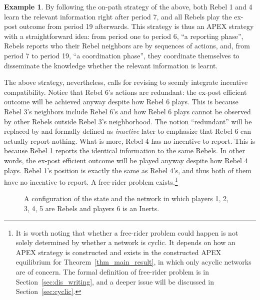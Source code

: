 \documentclass[12pt,letter]{article}
\theoremstyle{definition}
\newtheorem{example}{Example}
\theoremstyle{definition}
\theoremstyle{remark}
\theoremstyle{claim}
\begin{document}
\begin{example}
By following the on-path strategy of the above, both Rebel 1 and 4 learn the relevant information right after period 7, and all Rebels play the ex-post outcome from period 19 afterwards. This strategy is thus an APEX strategy with a straightforward idea: from period one to period 6, ``a {reporting phase}'', Rebels reports who their Rebel neighbors are by sequences of actions, and, from period 7 to period 19, ``a {coordination phase}'', they coordinate themselves to disseminate the knowledge whether the relevant information is learnt. 
\end{example}

The above strategy, nevertheless, calls for revising to seemly integrate incentive compatibility. Notice that Rebel 6's actions are redundant: the ex-post efficient outcome will be achieved anyway despite how Rebel 6 plays. This is because Rebel 3's neighbors include Rebel 6's and how Rebel 6 plays cannot be observed by other Rebels outside Rebel 3's neighborhood. The notion ``redundant'' will be replaced by and formally defined as \textit{inactive} later to emphasize that Rebel 6 can actually report nothing. What is more, Rebel 4 has no incentive to report. This is because Rebel 1 reports the identical information to the same Rebels. In other words, the ex-post efficient outcome will be played anyway despite how Rebel 4 plays. Rebel 1's position is exactly the same as Rebel 4's, and thus both of them have no incentive to report. A free-rider problem exists.\footnote{It is worth noting that whether a free-rider problem could happen is not solely determined by whether a network is cyclic. It depends on how an APEX strategy is constructed and exists in the constructed APEX equilibrium for Theorem~\ref{thm_main_result}, in which only acyclic networks are of concern. The formal definition of free-rider problem is in Section~\ref{sec:dis_writing}, and a deeper issue will be discussed in Section~\ref{sec:cyclic}.} 

\begin{figure}
\begin{center}
\end{center}
\caption{A configuration of the state and the network in which players 1, 2, 3, 4, 5 are Rebels and players 6 is an Inerts.}
\label{fig:circle_with_bridge_5}
\end{figure}
\end{document}
